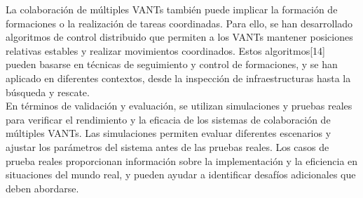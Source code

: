\documentclass[11pt,epsf,times]{article}
\begin{document}
La colaboraci\'{o}n de m\'{u}ltiples VANTs tambi\'{e}n puede implicar la formaci\'{o}n de formaciones o la realizaci\'{o}n de tareas coordinadas. Para ello, se han desarrollado algoritmos de control distribuido que permiten a los VANTs mantener posiciones relativas estables y realizar movimientos coordinados. Estos algoritmos[14] pueden basarse en t\'{e}cnicas de seguimiento y control de formaciones, y se han aplicado en diferentes contextos, desde la inspecci\'{o}n de infraestructuras hasta la b\'{u}squeda y rescate.\\

En t\'{e}rminos de validaci\'{o}n y evaluaci\'{o}n, se utilizan simulaciones y pruebas reales para verificar el rendimiento y la eficacia de los sistemas de colaboraci\'{o}n de m\'{u}ltiples VANTs. Las simulaciones permiten evaluar diferentes escenarios y ajustar los par\'{a}metros del sistema antes de las pruebas reales. Los casos de prueba reales proporcionan informaci\'{o}n sobre la implementaci\'{o}n y la eficiencia en situaciones del mundo real, y pueden ayudar a identificar desaf\'{i}os adicionales que deben abordarse.\\


\end{document}
